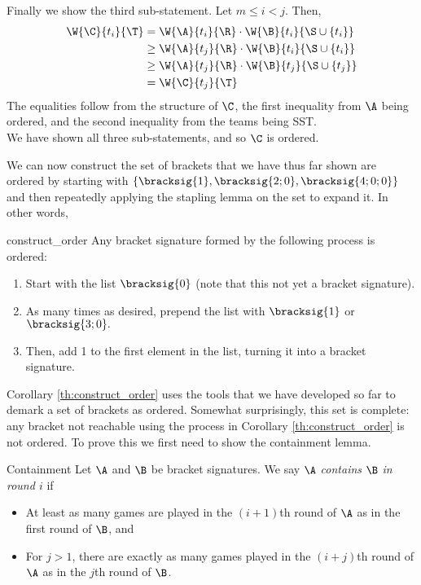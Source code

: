 {{Finally we show the third sub-statement. Let $m \leq i < j.$ Then,
\begin{align*}
    \W{\C}{t_i}{\T} &= \W{\A}{t_i}{\R} \cdot \W{\B}{t_i}{\S \cup \{t_i\}}\\
    &\geq \W{\A}{t_j}{\R} \cdot \W{\B}{t_i}{\S \cup \{t_i\}}\\
    &\geq \W{\A}{t_j}{\R} \cdot \W{\B}{t_j}{\S \cup \{t_j\}}\\
    &= \W{\C}{t_j}{\T}
\end{align*}
The equalities follow from the structure of $\C$, the first inequality from $\A$ being ordered, and the second inequality from the teams being SST.\\

We have shown all three sub-statements, and so $\C$ is ordered.
}{}

We can now construct the set of brackets that we have thus far shown are ordered by starting with $\{\bracksig{1}, \bracksig{2; 0}, \bracksig{4; 0; 0}\}$ and then repeatedly applying the stapling lemma on the set to expand it. In other words,

\begin{corollary}{}{construct_order}
    Any bracket signature formed by the following process is ordered:
    \begin{enumerate}
        \item Start with the list $\bracksig{0}$ (note that this not yet a bracket signature).
        \item As many times as desired, prepend the list with $\bracksig{1}$ or $\bracksig{3; 0}.$
        \item Then, add 1 to the first element in the list, turning it into a bracket signature.
    \end{enumerate}
\end{corollary}

Corollary \ref{th:construct_order} uses the tools that we have developed so far to demark a set of brackets as ordered. Somewhat surprisingly, this set is complete: any bracket not reachable using the process in Corollary \ref{th:construct_order} is not ordered. To prove this we first need to show the containment lemma.

\begin{definition}{Containment}{}
    Let $\A$ and $\B$ be bracket signatures. We say $\A$ \textit{contains} $\B$ \textit{in round $i$} if
    \begin{itemize}
        \item At least as many games are played in the $(i+1)$th round of $\A$ as in the first round of $\B$, and
        \item For $j > 1$, there are exactly as many games played in the $(i + j)$th round of $\A$ as in the $j$th round of $\B$.
    \end{itemize}
\end{definition}

}
